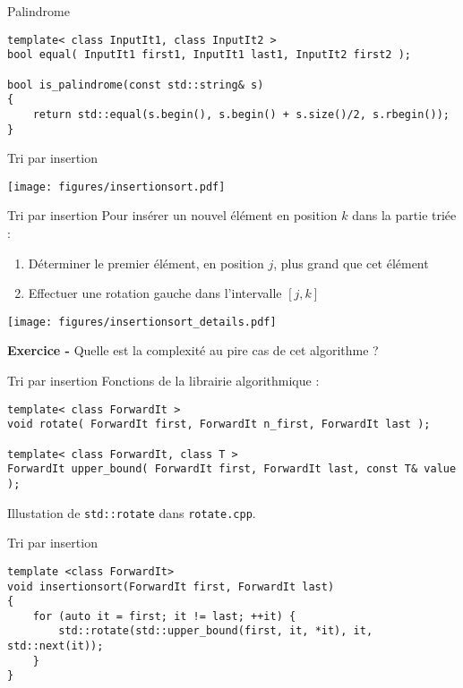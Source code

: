 \documentclass[handout]{beamer}
\begin{document}
\begin{frame}[fragile]{Palindrome}
    \begin{lstlisting}
template< class InputIt1, class InputIt2 >
bool equal( InputIt1 first1, InputIt1 last1, InputIt2 first2 );

bool is_palindrome(const std::string& s)
{
    return std::equal(s.begin(), s.begin() + s.size()/2, s.rbegin());
}
    \end{lstlisting}
\end{frame}

\begin{frame}[fragile]{Tri par insertion}
    \begin{center}
        \texttt{[image: figures/insertionsort.pdf]}
    \end{center}
\end{frame}

\begin{frame}[fragile]{Tri par insertion}
    Pour insérer un nouvel élément en position $k$ dans la partie triée :
    \begin{enumerate}
        \item Déterminer le premier élément, en position $j$, plus grand que cet élément
        \item Effectuer une rotation gauche dans l'intervalle $[j, k]$
    \end{enumerate}
    \begin{center}
        \texttt{[image: figures/insertionsort\_details.pdf]}
    \end{center}
    \textbf{Exercice -} Quelle est la complexité au pire cas de cet algorithme ?
\end{frame}

\begin{frame}[fragile]{Tri par insertion}
    Fonctions de la librairie algorithmique :
    \begin{lstlisting}
template< class ForwardIt >
void rotate( ForwardIt first, ForwardIt n_first, ForwardIt last );

template< class ForwardIt, class T >
ForwardIt upper_bound( ForwardIt first, ForwardIt last, const T& value );
    \end{lstlisting}
    Illustation de \lstinline{std::rotate} dans \lstinline{rotate.cpp}.
\end{frame}


\begin{frame}[fragile]{Tri par insertion}
    \begin{lstlisting}
template <class ForwardIt>
void insertionsort(ForwardIt first, ForwardIt last)
{
    for (auto it = first; it != last; ++it) {
        std::rotate(std::upper_bound(first, it, *it), it, std::next(it));
    }
}
    \end{lstlisting}
\end{frame}
\end{document}
